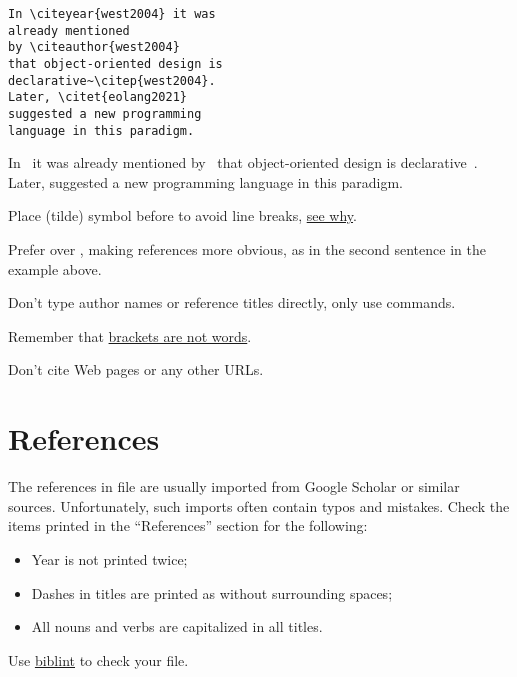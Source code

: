 \documentclass[12pt,nonacm,natbib=false]{acmart}
\begin{document}
\begin{multicols}{2}
\setlength{\parskip}{0pt}
\small
\raggedcolumns
\begin{verbatim}
In \citeyear{west2004} it was
already mentioned
by \citeauthor{west2004}
that object-oriented design is
declarative~\citep{west2004}.
Later, \citet{eolang2021}
suggested a new programming
language in this paradigm.
\end{verbatim}

\columnbreak

\raggedright
In~\citeyear{west2004} it was already
mentioned by~\citeauthor{west2004} that
object-oriented design is
declarative~\citep{west2004}.
Later, \citet{eolang2021}
suggested a new programming
language in this paradigm.

\AtNextBibliography{\small}
\setlength\bibitemsep{3pt}
{\raggedright\printbibliography[heading=none]}
\end{multicols}

Place \ff{\~} (tilde) symbol before  to avoid line breaks, \href{https://tex.stackexchange.com/questions/41264/what-is-the-difference-in-citing-referencing-with-or-without-tilde}{see why}.

Prefer  over , making references more obvious, as in the second sentence in the example above.

Don't type author names or reference titles directly, only use  commands.

Remember that \href{https://www.ece.ucdavis.edu/~jowens/biberrors.html}{brackets are not words}.

Don't cite Web pages or any other URLs.

\section{References}

The references in  file are usually imported from Google Scholar or similar sources. Unfortunately, such imports often contain typos and mistakes. Check the items printed in the ``References'' section for the following:

\begin{itemize}
    \item Year is not printed twice;
    \item Dashes in titles are printed as \ff{-{}-{}-} without surrounding spaces;
    \item All nouns and verbs are capitalized in all titles.
\end{itemize}

Use \href{https://github.com/Kingsford-Group/biblint}{biblint} to check your  file.
\end{document}
